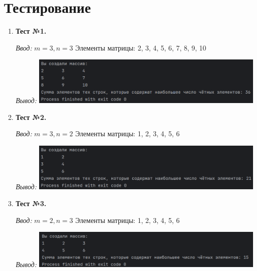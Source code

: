 \documentclass[12pt]{article}
\begin{document}
\newpage


\section*{Тестирование}

\begin{enumerate}

\item \textbf{Тест №1.} 

\textit{Ввод:} 
$m=3, n=3$
Элементы матрицы: 2, 3, 4, 5, 6, 7, 8, 9, 10

\textit{Вывод:} \includegraphics[width=0.9\textwidth]{img1}



\item \textbf{Тест №2.}

\textit{Ввод:}
$m=3, n=2$
Элементы матрицы: 1, 2, 3, 4, 5, 6

\textit{Вывод:} \includegraphics[width=0.9\textwidth]{img2}



\item \textbf{Тест №3.}

\textit{Ввод:}
$m=2, n=3$
Элементы матрицы: 1, 2, 3, 4, 5, 6

\textit{Вывод:} \includegraphics[width=0.9\textwidth]{img3}


\end{enumerate}
\end{document}
